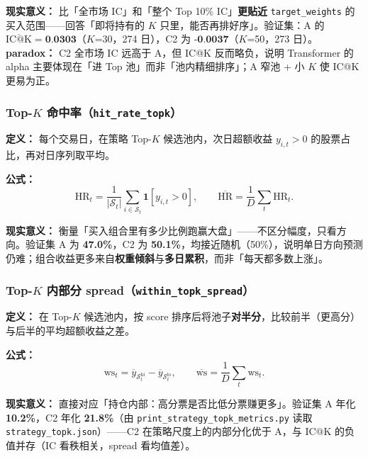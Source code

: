 \documentclass[UTF8,a4paper,12pt]{ctexart}
\begin{document}
\textbf{现实意义：} 比「全市场 IC」和「整个 Top 10\% IC」\textbf{更贴近} \texttt{target\_weights} 的买入范围——回答「即将持有的 $K$ 只里，能否再排好序」。验证集：A 的 $\overline{\mathrm{IC@K}}=\textbf{0.0303}$（$K$=30，274 日），C2 为 $\textbf{-0.0037}$（$K$=50，273 日）。\textbf{ paradox：} C2 全市场 IC 远高于 A，但 IC@K 反而略负，说明 Transformer 的 alpha 主要体现在「进 Top 池」而非「池内精细排序」；A 窄池 + 小 $K$ 使 IC@K 更易为正。

\subsubsection{Top-$K$ 命中率（\texttt{hit\_rate\_topk}）}

\textbf{定义：} 每个交易日，在策略 Top-$K$ 候选池内，次日超额收益 $y_{i,t}>0$ 的股票占比，再对日序列取平均。

\textbf{公式：}
\begin{equation}
  \mathrm{HR}_t = \frac{1}{|\mathcal S_t|}\sum_{i\in\mathcal S_t}\mathbf 1[y_{i,t}>0],
  \qquad
  \overline{\mathrm{HR}} = \frac{1}{D}\sum_t \mathrm{HR}_t.
\end{equation}

\textbf{现实意义：} 衡量「买入组合里有多少比例跑赢大盘」——不区分幅度，只看方向。验证集 A 为 \textbf{47.0\%}，C2 为 \textbf{50.1\%}，均接近随机（50\%），说明单日方向预测仍难；组合收益更多来自\textbf{权重倾斜}与\textbf{多日累积}，而非「每天都多数上涨」。

\subsubsection{Top-$K$ 内部分 spread（\texttt{within\_topk\_spread}）}

\textbf{定义：} 在 Top-$K$ 候选池内，按 score 排序后将池子\textbf{对半分}，比较前半（更高分）与后半的平均超额收益之差。

\textbf{公式：}
\begin{equation}
  \mathrm{ws}_t = \overline{y}_{\mathcal S_t^{\mathrm{hi}}} - \overline{y}_{\mathcal S_t^{\mathrm{lo}}},
  \qquad
  \overline{\mathrm{ws}} = \frac{1}{D}\sum_t \mathrm{ws}_t.
\end{equation}

\textbf{现实意义：} 直接对应「持仓内部：高分票是否比低分票赚更多」。验证集 A 年化 \textbf{10.2\%}，C2 年化 \textbf{21.8\%}（由 \texttt{print\_strategy\_topk\_metrics.py} 读取 \texttt{strategy\_topk.json}）——C2 在策略尺度上的内部分化优于 A，与 IC@K 的负值并存（IC 看秩相关，spread 看均值差）。
\end{document}
